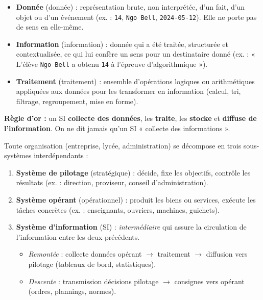 \documentclass[11pt]{article}
\newcommand{\cle}[1]{{\popxbold\color{popdark}#1}}
\begin{document}
\begin{definition}
\begin{itemize}
\item \textbf{Donnée} (\cle{donnée}) : représentation brute, non interprétée, d'un fait, d'un objet ou d'un événement (ex. : \texttt{14}, \texttt{Ngo Bell}, \texttt{2024-05-12}). Elle ne porte pas de sens en elle-même.
\item \textbf{Information} (\cle{information}) : donnée qui a été traitée, structurée et contextualisée, ce qui lui confère un sens pour un destinataire donné (ex. : « L'élève \texttt{Ngo Bell} a obtenu \texttt{14} à l'épreuve d'algorithmique »).
\item \textbf{Traitement} (\cle{traitement}) : ensemble d'opérations logiques ou arithmétiques appliquées aux données pour les transformer en information (calcul, tri, filtrage, regroupement, mise en forme).
\end{itemize}
\textbf{Règle d'or :} un SI \textbf{collecte des données}, les \textbf{traite}, les \textbf{stocke} et \textbf{diffuse de l'information}. On ne dit jamais qu'un SI « collecte des informations ».
\end{definition}

\begin{aretenir}
Toute organisation (entreprise, lycée, administration) se décompose en trois sous-systèmes interdépendants :
\begin{enumerate}
\item \textbf{Système de pilotage} (stratégique) : décide, fixe les objectifs, contrôle les résultats (ex. : direction, proviseur, conseil d'administration).
\item \textbf{Système opérant} (opérationnel) : produit les biens ou services, exécute les tâches concrètes (ex. : enseignants, ouvriers, machines, guichets).
\item \textbf{Système d'information} (SI) : \emph{intermédiaire} qui assure la circulation de l'information entre les deux précédents.
      \begin{itemize}
      \item \emph{Remontée} : collecte données opérant $\rightarrow$ traitement $\rightarrow$ diffusion vers pilotage (tableaux de bord, statistiques).
      \item \emph{Descente} : transmission décisions pilotage $\rightarrow$ consignes vers opérant (ordres, plannings, normes).
      \end{itemize}
\end{enumerate}
\end{aretenir}
\end{document}
